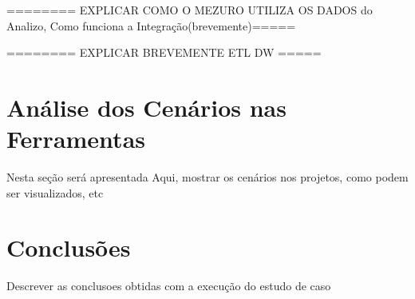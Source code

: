 ======== EXPLICAR COMO O MEZURO UTILIZA OS DADOS do Analizo, Como funciona a Integração(brevemente)=====


======== EXPLICAR BREVEMENTE ETL DW =====



\section{Análise dos Cenários nas Ferramentas}

Nesta seção será apresentada Aqui, mostrar os cenários nos projetos, como podem ser visualizados, etc


\section{Conclusões}

Descrever as conclusoes obtidas com a execução do estudo de caso